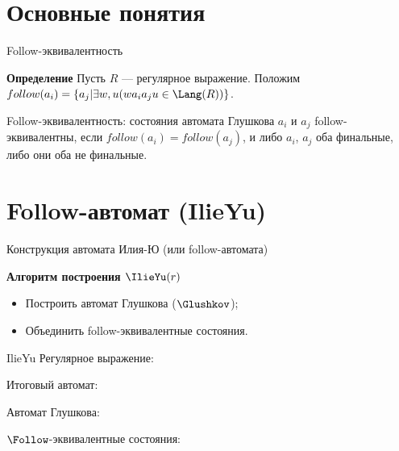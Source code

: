 \section{Основные понятия}
\begin{frame}{Follow-эквивалентность}
  \begin{block}{\bf Определение}
    Пусть $R$ --- регулярное выражение. Положим $follow(a_{i}) = \{a_{j} | \exists w, u(wa_{i}a_{j}u \in\Lang(R))\}$.

    Follow-эквивалентность: состояния автомата Глушкова $a_{i}$ и $a_{j}$ follow-эквивалентны, если $follow(a_{i}) = follow(a_{j})$, и либо $a_{i}$, $a_{j}$ оба финальные, либо они оба не финальные.
  \end{block} %
\end{frame}

\section{Follow-автомат (IlieYu)}
\begin{frame}{Конструкция автомата Илия-Ю (или follow-автомата)}
  \begin{block}{\bf Алгоритм построения $\IlieYu(r)$}
    \begin{itemize}
      \item Построить автомат Глушкова ($\Glushkov$);
      \item Объединить follow-эквивалентные состояния.
    \end{itemize}
  \end{block} %
\end{frame}

\begin{frame}{IlieYu}
	Регулярное выражение:

	Итоговый автомат:


	Автомат Глушкова:


	$\Follow$-эквивалентные состояния:


\end{frame}


